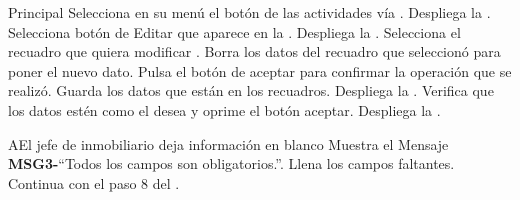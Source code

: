 \begin{UCtrayectoria}{Principal}
	\UCpaso[\UCactor] Selecciona en su menú el botón de las actividades vía .
	\UCpaso Despliega la .
	\UCpaso[\UCactor] Selecciona botón de Editar que aparece en la .
	\UCpaso Despliega la .
	\UCpaso[\UCactor] Selecciona el recuadro que quiera modificar .
	\UCpaso[\UCactor] Borra los datos del recuadro que seleccionó para poner el nuevo dato.
	\UCpaso[\UCactor] Pulsa el botón de aceptar para confirmar la operación que se realizó.
	\UCpaso Guarda los datos que están en los recuadros.	
	\UCpaso Despliega la .
	\UCpaso[\UCactor] Verifica que los datos estén como el desea y oprime el botón aceptar.
	\UCpaso Despliega la .
\end{UCtrayectoria}

\begin{UCtrayectoriaA}{A}{El jefe de inmobiliario deja información en blanco}
	\UCpaso Muestra el Mensaje {\bf MSG3-}``Todos los campos son obligatorios.''.
	\UCpaso[\UCactor] Llena los campos faltantes.
	\UCpaso[\UCactor] Continua con el paso 8 del .
\end{UCtrayectoriaA}



